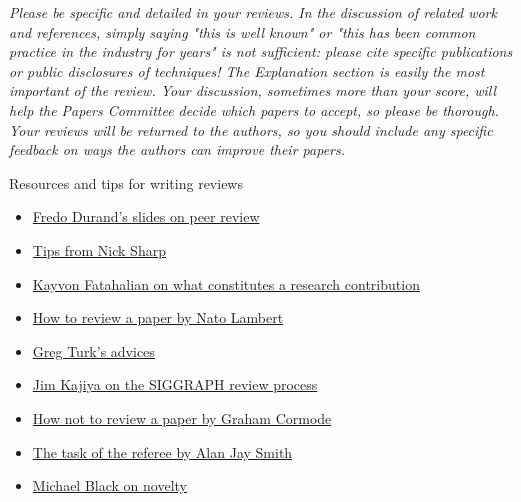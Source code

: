 \textit{Please be specific and detailed in your reviews. In the discussion of related work and references, simply saying "this is well known" or "this has been common practice in the industry for years" is not sufficient: please cite specific publications or public disclosures of techniques! The Explanation section is easily the most important of the review. Your discussion, sometimes more than your score, will help the Papers Committee decide which papers to accept, so please be thorough. Your reviews will be returned to the authors, so you should include any specific feedback on ways the authors can improve their papers.}

Resources and tips for writing reviews
\begin{itemize}
	\item \href{http://people.csail.mit.edu/fredo/review.pdf}{Fredo Durand's slides on peer review}
	\item \href{https://twitter.com/nmwsharp/status/1491528553766305801}{Tips from Nick Sharp}
	\item \href{https://graphics.stanford.edu/~kayvonf/notes/systemspaper/}{Kayvon Fatahalian on what constitutes a research contribution}
	\item \href{https://www.natolambert.com/guides/how-to-review-a-paper}{How to review a paper by Nato Lambert}
	\item \href{https://web.archive.org/web/20180124233323/http:/www.siggraph.org/s2008/submissions/juried/papers/review_writing.php}{Greg Turk's advices}
	\item \href{https://www.siggraph.org/sites/default/files/kajiya.pdf}{Jim Kajiya on the SIGGRAPH review process}
	\item \href{https://sigmodrecord.org/publications/sigmodRecord/0812/p100.open.cormode.pdf}{How not to review a paper by Graham Cormode}
	\item \href{https://www.cs.princeton.edu/~jrex/teaching/spring2005/fft/reviewing.html}{The task of the referee by Alan Jay Smith}
	\item \href{https://perceiving-systems.blog/en/news/novelty-in-science}{Michael Black on novelty}
\end{itemize}

